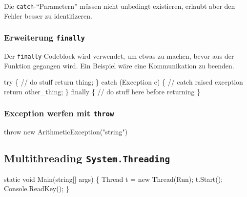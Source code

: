 \documentclass[
  9pt,
  a4paperpaper,
  DIV=11]{scrartcl}
\newenvironment{Shaded}{}{}
\newcommand{\CommentTok}[1]{\textcolor[rgb]{0.42,0.45,0.49}{#1}}
\newcommand{\DataTypeTok}[1]{\textcolor[rgb]{0.84,0.23,0.29}{#1}}
\newcommand{\FunctionTok}[1]{\textcolor[rgb]{0.44,0.26,0.76}{#1}}
\newcommand{\KeywordTok}[1]{\textcolor[rgb]{0.84,0.23,0.29}{#1}}
\newcommand{\NormalTok}[1]{\textcolor[rgb]{0.14,0.16,0.18}{#1}}
\newcommand{\OperatorTok}[1]{\textcolor[rgb]{0.14,0.16,0.18}{#1}}
\newcommand{\StringTok}[1]{\textcolor[rgb]{0.01,0.18,0.38}{#1}}
\numberwithin{equation}{section}
\begin{document}
\begin{multicols}{2}
Die \texttt{catch}-``Parametern'' müssen nicht unbedingt existieren,
erlaubt aber den Fehler besser zu identifizeren.

\hypertarget{erweiterung-finally}{%
\subsubsection{\texorpdfstring{Erweiterung
\texttt{finally}}{Erweiterung finally}}\label{erweiterung-finally}}

Der \texttt{finally}-Codeblock wird verwendet, um etwas zu machen, bevor
aus der Funktion gegangen wird. Ein Beispiel wäre eine Kommunikation zu
beenden.

\begin{Shaded}
\begin{Highlighting}[]
\KeywordTok{try} \OperatorTok{\{}
  \CommentTok{// do stuff}
  \KeywordTok{return}\NormalTok{ thing}\OperatorTok{;}
\OperatorTok{\}}
\KeywordTok{catch} \OperatorTok{(}\NormalTok{Exception e}\OperatorTok{)} \OperatorTok{\{}
  \CommentTok{// catch raised exception}
  \KeywordTok{return}\NormalTok{ other\_thing}\OperatorTok{;}
\OperatorTok{\}}
\KeywordTok{finally} \OperatorTok{\{}
  \CommentTok{// do stuff here before returning}
\OperatorTok{\}}
\end{Highlighting}
\end{Shaded}

\hypertarget{exception-werfen-mit-throw}{%
\subsubsection{\texorpdfstring{Exception werfen mit
\texttt{throw}}{Exception werfen mit throw}}\label{exception-werfen-mit-throw}}

\begin{Shaded}
\begin{Highlighting}[]
\KeywordTok{throw} \KeywordTok{new} \FunctionTok{ArithmeticException}\OperatorTok{(}\StringTok{"string"}\OperatorTok{)}
\end{Highlighting}
\end{Shaded}

\hypertarget{multithreading-system.threading}{%
\subsection{\texorpdfstring{Multithreading
\texttt{System.Threading}}{Multithreading System.Threading}}\label{multithreading-system.threading}}

\begin{Shaded}
\begin{Highlighting}[]
\KeywordTok{static} \DataTypeTok{void} \FunctionTok{Main}\OperatorTok{(}\DataTypeTok{string}\OperatorTok{[]}\NormalTok{ args}\OperatorTok{)} \OperatorTok{\{}
\NormalTok{  Thread t }\OperatorTok{=} \KeywordTok{new} \FunctionTok{Thread}\OperatorTok{(}\NormalTok{Run}\OperatorTok{);}
\NormalTok{  t}\OperatorTok{.}\FunctionTok{Start}\OperatorTok{();}
\NormalTok{  Console}\OperatorTok{.}\FunctionTok{ReadKey}\OperatorTok{();}
\OperatorTok{\}}


\end{Highlighting}
\end{Shaded}
\end{multicols}
\end{document}
